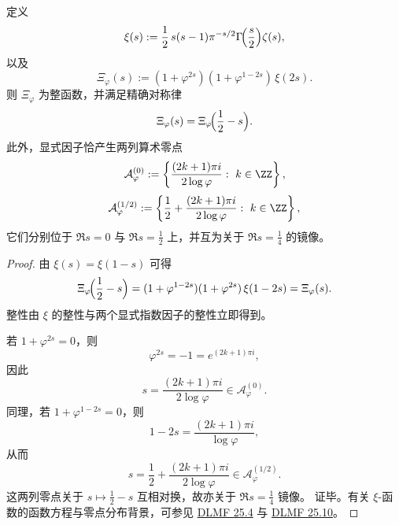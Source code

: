 \begin{theorem}\label{thm:xi-time-part9zbh-foldpi-quarter-line-completion}
定义
\[
\xi(s):=\frac12\,s(s-1)\pi^{-s/2}\Gamma\!\Bigl(\frac s2\Bigr)\zeta(s),
\]
以及
\[
\Xi_\varphi(s):=(1+\varphi^{2s})(1+\varphi^{1-2s})\,\xi(2s).
\]
则 \(\Xi_\varphi\) 为整函数，并满足精确对称律
\[
\Xi_\varphi(s)=\Xi_\varphi\!\Bigl(\frac12-s\Bigr).
\]
此外，显式因子恰产生两列算术零点
\[
\mathcal A_\varphi^{(0)}
:=
\left\{
\frac{(2k+1)\pi i}{2\log\varphi}:\ k\in\ZZ
\right\},
\]
\[
\mathcal A_\varphi^{(1/2)}
:=
\left\{
\frac12+\frac{(2k+1)\pi i}{2\log\varphi}:\ k\in\ZZ
\right\},
\]
它们分别位于 \(\Re s=0\) 与 \(\Re s=\frac12\) 上，并互为关于 \(\Re s=\frac14\) 的镜像。
\end{theorem}
\begin{proof}
由 \(\xi(s)=\xi(1-s)\) 可得
\[
\Xi_\varphi\!\Bigl(\frac12-s\Bigr)
=
(1+\varphi^{1-2s})(1+\varphi^{2s})\,\xi(1-2s)
=
\Xi_\varphi(s).
\]
整性由 \(\xi\) 的整性与两个显式指数因子的整性立即得到。

若 \(1+\varphi^{2s}=0\)，则
\[
\varphi^{2s}=-1=e^{(2k+1)\pi i},
\]
因此
\[
s=\frac{(2k+1)\pi i}{2\log\varphi}\in \mathcal A_\varphi^{(0)}.
\]
同理，若 \(1+\varphi^{1-2s}=0\)，则
\[
1-2s=\frac{(2k+1)\pi i}{\log\varphi},
\]
从而
\[
s=\frac12+\frac{(2k+1)\pi i}{2\log\varphi}\in \mathcal A_\varphi^{(1/2)}.
\]
这两列零点关于 \(s\mapsto \frac12-s\) 互相对换，故亦关于 \(\Re s=\frac14\) 镜像。
证毕。有关 \(\xi\)-函数的函数方程与零点分布背景，可参见 \href{https://dlmf.nist.gov/25.4}{DLMF 25.4} 与 \href{https://dlmf.nist.gov/25.10}{DLMF 25.10}。
\end{proof}

